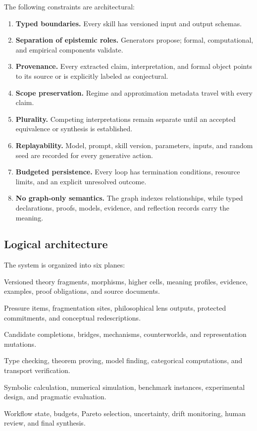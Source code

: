 \documentclass[11pt]{article}
\begin{document}
The following constraints are architectural:
\begin{enumerate}
  \item \textbf{Typed boundaries.} Every skill has versioned input and output schemas.
  \item \textbf{Separation of epistemic roles.} Generators propose; formal, computational, and empirical
  components validate.
  \item \textbf{Provenance.} Every extracted claim, interpretation, and formal object points to its
  source or is explicitly labeled as conjectural.
  \item \textbf{Scope preservation.} Regime and approximation metadata travel with every claim.
  \item \textbf{Plurality.} Competing interpretations remain separate until an accepted equivalence or
  synthesis is established.
  \item \textbf{Replayability.} Model, prompt, skill version, parameters, inputs, and random seed are
  recorded for every generative action.
  \item \textbf{Budgeted persistence.} Every loop has termination conditions, resource limits, and an
  explicit unresolved outcome.
  \item \textbf{No graph-only semantics.} The graph indexes relationships, while typed declarations,
  proofs, models, evidence, and reflection records carry the meaning.
\end{enumerate}

\subsection{Logical architecture}

The system is organized into six planes:
\begin{description}[leftmargin=3.0cm,style=nextline]
  \item[Knowledge plane.] Versioned theory fragments, morphisms, higher cells, meaning profiles,
  evidence, examples, proof obligations, and source documents.
  \item[Interpretive plane.] Pressure items, fragmentation sites, philosophical lens outputs, protected
  commitments, and conceptual redescriptions.
  \item[Generative plane.] Candidate completions, bridges, mechanisms, counterworlds, and representation
  mutations.
  \item[Formal plane.] Type checking, theorem proving, model finding, categorical computations, and
  transport verification.
  \item[Concrete plane.] Symbolic calculation, numerical simulation, benchmark instances, experimental
  design, and pragmatic evaluation.
  \item[Control plane.] Workflow state, budgets, Pareto selection, uncertainty, drift monitoring,
  human review, and final synthesis.
\end{description}
\end{document}
